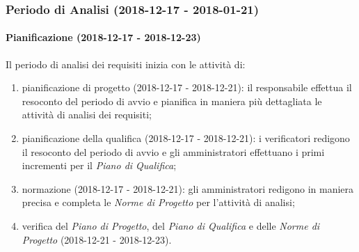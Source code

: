 	\subsubsection{Periodo di Analisi (2018-12-17 - 2018-01-21)}	
		\paragraph{Pianificazione (2018-12-17 - 2018-12-23)\\} Il periodo di analisi dei requisiti inizia con le attività di:
			\begin{enumerate}[label = 2.1.\arabic*)]
				\item pianificazione di progetto (2018-12-17 - 2018-12-21): il responsabile effettua il resoconto del periodo di avvio e pianifica in maniera più dettagliata le attività di analisi dei requisiti; 
				\item pianificazione della qualifica (2018-12-17 - 2018-12-21): i verificatori redigono il resoconto del periodo di avvio e gli amministratori effettuano i primi incrementi per il \textit{Piano di Qualifica};
				\item normazione (2018-12-17 - 2018-12-21): gli amministratori redigono in maniera precisa e completa le \textit{Norme di Progetto} per l'attività di analisi;
				\item verifica del \textit{Piano di Progetto}, del \textit{Piano di Qualifica} e delle \textit{Norme di Progetto} (2018-12-21 - 2018-12-23).
			\end{enumerate}
